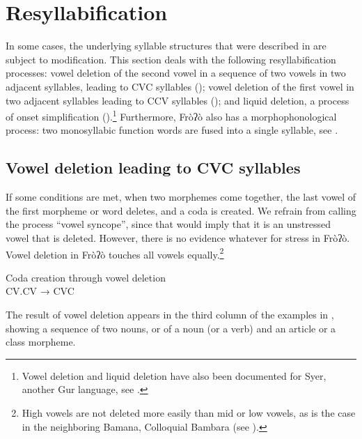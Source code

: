 \documentclass[output=paper]{langscibook}
\begin{document}
\section{Resyllabification}
\label{sec:traore:resyllabification:3}

In some cases, the underlying syllable structures that were described in  are subject to modification. This section deals with the following resyllabification processes: vowel deletion of the second vowel in a sequence of two vowels in two adjacent syllables, leading to CVC syllables (); vowel deletion of the first vowel in two adjacent syllables leading to CCV syllables (); and liquid deletion, a process of onset simplification ().\footnote{Vowel deletion and liquid deletion have also been documented for Syer, another Gur language, see \citet{Dombrowsky2015}.} Furthermore, Fròʔò also has a morphophonological process: two monosyllabic function words are fused into a single syllable, see . 

\subsection{ Vowel deletion leading to CVC syllables}
\label{sec:traore:vowel_deletion_to_cvc:3a}

If some conditions are met, when two morphemes come together, the last vowel of the first morpheme or word deletes, and a coda is created. We refrain from calling the process ``vowel syncope'', since that would imply that it is an unstressed vowel that is deleted. However, there is no evidence whatever for stress in Fròʔò. Vowel deletion in Fròʔò touches all vowels equally.\footnote{High vowels are not deleted more easily than mid or low vowels, as is the case in the neighboring Bamana, Colloquial Bambara (see \citealt{Green2014}).}

\begin{exe}
\ex Coda creation through vowel deletion \label{ex:traore:codaCreationVowelDeletion:20}\\
    CV.CV → CVC
 \end{exe}

The result of vowel deletion appears in the third column of the examples in , showing a sequence of two nouns, or of a noun (or a verb) and an article or a class morpheme. 
\end{document}

